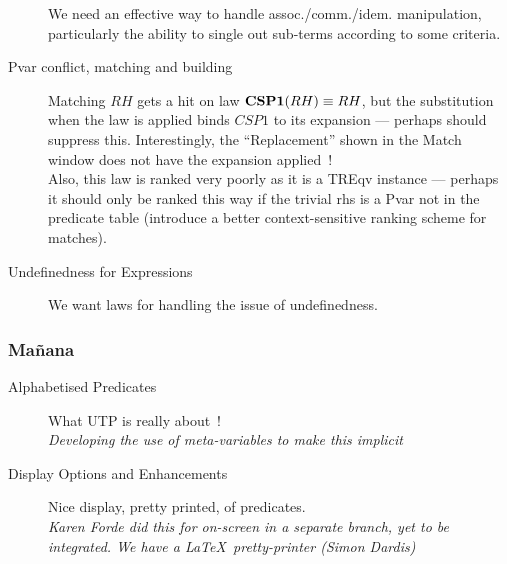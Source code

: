 \begin{description}
    We need an effective way to handle assoc./comm./idem. manipulation,
    particularly the ability to single out sub-terms according to some criteria.
  \item[Pvar conflict, matching and building]
    Matching $RH$ gets a hit on law $\mathbf{{CSP}{1}}(RH)\equiv RH$,
    but the substitution when the law is applied binds $CSP1$
    to its expansion --- perhaps should suppress this.
    Interestingly, the ``Replacement'' shown in the Match window
    does not have the expansion applied~!
    \\
    Also, this law is ranked very poorly as it is a TREqv instance
    --- perhaps it should only be ranked this way if the trivial rhs
    is a Pvar not in the predicate table (introduce a better context-sensitive
    ranking scheme for matches).
  \item[Undefinedness for Expressions]
    We want laws for handling the issue of undefinedness.
\end{description}

\subsubsection{Ma\~nana}

\begin{description}
  \item[Alphabetised Predicates]
    What UTP is really about~!
    \\\textit{Developing the use of meta-variables to make this implicit}
  \item[Display Options and Enhancements]
    Nice display, pretty printed, of predicates.
    \\\textit{
      Karen Forde did this for on-screen in a separate branch,
      yet to be integrated. We have a \LaTeX\ pretty-printer (Simon Dardis)
    }
\end{description}

